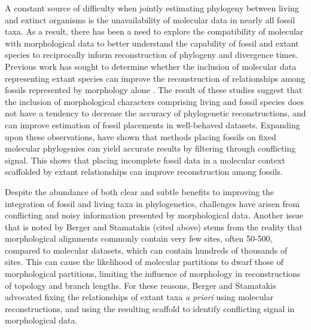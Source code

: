 \documentclass[12pt]{article}
\begin{document}
A constant source of difficulty when jointly estimating phylogeny between living
and extinct organisms is the unavailability of molecular data in nearly
all fossil taxa. As a result, there has been a need to explore the
compatibility of molecular with morphological data to better understand
the capability of fossil and extant species to reciprocally inform
reconstruction of phylogeny and divergence times. Previous work has
sought to determine whether the inclusion of molecular data representing
extant species can improve the reconstruction of relationships among
fossils represented by morphology alone \citep{wiens2009paleontology,wiens2010combining}. The result
of these studies suggest that the inclusion of morphological characters
comprising living and fossil species does not have a tendency to
decrease the accuracy of phylogenetic reconstructions, and can improve
estimation of fossil placements in well-behaved datasets. Expanding upon
these observations, \cite{berger2010fossilplacement} have shown that methods
placing fossils on fixed molecular phylogenies can yield accurate
results by filtering through conflicting signal. This shows
that placing incomplete fossil data in a molecular context scaffolded by
extant relationships can improve reconstruction among fossils.


Despite the abundance of both clear and subtle benefits to improving the
integration of fossil and living taxa in phylogenetics, challenges have
arisen from conflicting and noisy information presented by morphological
data. Another issue that is noted by Berger and Stamatakis (cited above) stems from the reality that
morphological alignments commonly contain very few sites, often 50-500,
compared to molecular datasets, which can contain hundreds of thousands
of sites. This can cause the likelihood of molecular partitions to dwarf
those of morphological partitions, limiting the influence of morphology
in reconstructions of topology and branch lengths. For these reasons,
Berger and Stamatakis advocated fixing the relationships of extant taxa
\emph{a priori} using molecular reconstructions, and using the resulting
scaffold to identify conflicting signal in morphological data.
\end{document}
